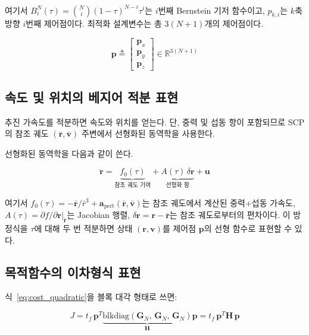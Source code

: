 \documentclass[11pt]{article}
\begin{document}
여기서 $B_i^N(\tau) = \binom{N}{i}(1-\tau)^{N-i}\tau^i$는 $i$번째 Bernstein 기저 함수이고,
$p_{k,i}$는 $k$축 방향 $i$번째 제어점이다.
최적화 설계변수는 총 $3(N+1)$개의 제어점이다.

\begin{equation}
  \mathbf{p} \triangleq \begin{bmatrix}\mathbf{p}_x \\ \mathbf{p}_y \\ \mathbf{p}_z\end{bmatrix} \in \mathbb{R}^{3(N+1)}
  \label{eq:design_var}
\end{equation}

\subsection{속도 및 위치의 베지어 적분 표현}

추진 가속도를 적분하면 속도와 위치를 얻는다.
단, 중력 및 섭동 항이 포함되므로 SCP의 참조 궤도 $(\bar{\mathbf{r}}, \bar{\mathbf{v}})$
주변에서 선형화된 동역학을 사용한다.

선형화된 동역학을 다음과 같이 쓴다.

\begin{equation}
  \ddot{\mathbf{r}} = \underbrace{f_0(\tau)}_{\text{참조 궤도 기여}} + \underbrace{A(\tau)\,\delta\mathbf{r}}_{\text{선형화 항}} + \mathbf{u}
  \label{eq:linearized_dynamics}
\end{equation}

여기서 $f_0(\tau) = -\bar{\mathbf{r}}/\bar{r}^3 + \mathbf{a}_\mathrm{pert}(\bar{\mathbf{r}}, \bar{\mathbf{v}})$는
참조 궤도에서 계산된 중력+섭동 가속도,
$A(\tau) = \partial f/\partial \mathbf{r}|_{\bar{\mathbf{r}}}$는 Jacobian 행렬,
$\delta\mathbf{r} = \mathbf{r} - \bar{\mathbf{r}}$는 참조 궤도로부터의 편차이다.
이 방정식을 $\tau$에 대해 두 번 적분하면 상태 $(\mathbf{r}, \mathbf{v})$를
제어점 $\mathbf{p}$의 선형 함수로 표현할 수 있다.

\subsection{목적함수의 이차형식 표현}

식~\eqref{eq:cost_quadratic}을 블록 대각 형태로 쓰면:

\begin{equation}
  J = t_f\, \mathbf{p}^T \underbrace{\mathrm{blkdiag}(\mathbf{G}_N,\, \mathbf{G}_N,\, \mathbf{G}_N)}_{\mathbf{H}} \mathbf{p}
  = t_f\, \mathbf{p}^T \mathbf{H}\, \mathbf{p}
  \label{eq:cost_block}
\end{equation}
\end{document}
